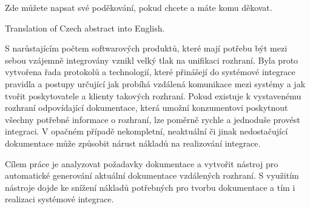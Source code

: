 \documentclass[11pt,twoside,a4paper]{book}
\begin{document}

\coverpagestarts


\acknowledgements
\noindent
Zde můžete napsat své poděkování, pokud chcete a máte komu děkovat.





 
\abstractpage

Translation of Czech abstract into English.


\baselineskip
S narůstajícím počtem softwarových produktů, které mají potřebu být mezi sebou vzájemně
integrovány vznikl velký tlak na unifikaci rozhraní. Byla proto vytvořena řada protokolů a
technologií, které přinášejí do systémové integrace pravidla a postupy určující jak probíhá
vzdálená komunikace mezi systémy a jak tvořit poskytovatele a klienty takových rozhraní.
Pokud existuje k vystavenému rozhraní odpovídající dokumentace, která umožní
konzumentovi poskytnout všechny potřebné informace o rozhraní, lze poměrně rychle a
jednoduše provést integraci. V opačném případě nekompletní, neaktuální či jinak
nedostačující dokumentace může způsobit nárust nákladů na realizování integrace.

Cílem práce je analyzovat požadavky dokumentace a vytvořit nástroj pro automatické
generování aktuální dokumentace vzdálených rozhraní. S využitím nástroje dojde ke snížení
nákladů potřebných pro tvorbu dokumentace a tím i realizaci systémové integrace.



\tableofcontents



\listoffigures



\listoftables


\end{document}
